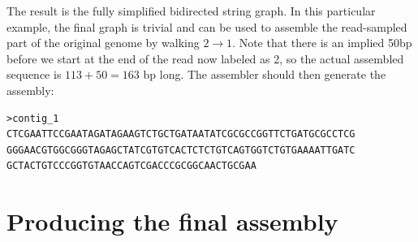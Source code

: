 \documentclass[10pt]{article}
\begin{document}

The result is the fully simplified bidirected string graph.  In this particular
example, the final graph is trivial and can be used to assemble the read-sampled
part of the original genome by walking $2 \to 1$.  Note that there is an implied
50bp before we start at the end of the read now labeled as 2, so the actual
assembled sequence is $113 + 50 = 163$ bp long.  The assembler should then
generate the assembly:

\begin{verbatim}
>contig_1
CTCGAATTCCGAATAGATAGAAGTCTGCTGATAATATCGCGCCGGTTCTGATGCGCCTCG
GGGAACGTGGCGGGTAGAGCTATCGTGTCACTCTCTGTCAGTGGTCTGTGAAAATTGATC
GCTACTGTCCCGGTGTAACCAGTCGACCCGCGGCAACTGCGAA
\end{verbatim}

\section{Producing the final assembly}
\end{document}

